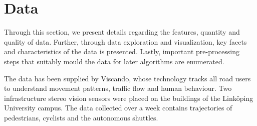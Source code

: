 \documentclass{article}
\begin{document}
\section{Data}
Through this section, we present details regarding the features, quantity and quality of data. Further, through data exploration and visualization, key facets and characteristics of the data is presented. Lastly, important pre-processing steps that suitably mould the data for later algorithms are enumerated. 

The data has been supplied by Viscando, whose technology tracks all road users to understand movement patterns, traffic flow and human behaviour. Two infrastructure stereo vision sensors were placed on the buildings of the Link\"{o}ping University campus. The data collected over a week contains trajectories of pedestrians, cyclists and the autonomous shuttles. 
\end{document}
